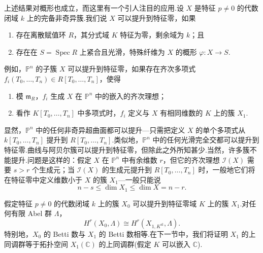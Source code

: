 上述结果对概形也成立，而这里有一个引人注目的应用.设 $X$ 是特征 $p \neq 0$ 的代数闭域 $k$ 上的完备非奇异簇.我们说 $X$ 可以提升到特征零，如果
\begin{enumerate}
  \item 存在离散赋值环 $R$，其分式域 $K$ 特征为零，剩余域为 $k$；且
  \item 存在在 $S = \operatorname{Spec} R$ 上紧合且光滑，特殊纤维为 $X$ 的概形 $\varphi \colon X \to S$.
\end{enumerate}
例如，$\mathbb{P}^{n}$ 的子簇 $X$ 可以提升到特征零，如果存在齐次多项式 $f_i(T_0, \ldots, T_n) \in R[T_0, \ldots, T_n]$，使得
\begin{enumerate}
  \item 模 $\mathfrak{m}_{R}$，$f_i$ 生成 $X$ 在 $\mathbb{P}^{n}$ 中的嵌入的齐次理想；
  \item 看作 $K[T_0, \ldots, T_n]$ 中多项式时，$f_i$ 定义与 $X$ 有相同维数的 $K$ 上的簇 $X_1$.
\end{enumerate}
显然，$\mathbb{P}^{n}$ 中的任何非奇异超曲面都可以提升---只需把定义 $X$ 的单个多项式从 $k[T_0, \ldots, T_n]$ 提升到 $R[T_0, \ldots, T_n]$.类似地，$\mathbb{P}^{n}$ 中的任何光滑完全交都可以提升到特征零.曲线与阿贝尔簇可以提升到特征零，但除此之外所知甚少.当然，许多簇不能提升.问题是这样的：假定 $X$ 在 $\mathbb{P}^{n}$ 中有余维数 $r$，但它的齐次理想 $\mathcal{I}(X)$ 需要 $s > r$ 个生成元；当 $\mathcal{I}(X)$ 的生成元提升到 $R[T_0, \ldots, T_n]$ 时，一般地它们将在特征零中定义维数小于 $X$ 的簇 $X_1$---一般只能说
\[
n - s \leq \dim X_1 \leq \dim X = n - r.
\]

\begin{theorem}\label{thm:20.5}
假定特征 $p \neq 0$ 的代数闭域 $k$ 上的簇 $X_0$ 可以提升到特征零域 $K$ 上的簇 $X_1$.对任何有限 Abel 群 $\Lambda$，
\[
H^{r}(X_0, \Lambda) \cong H^{r}(X_{1, K^{\mathrm{al}}}, \Lambda).
\]
特别地，$X_0$ 的 Betti 数与 $X_1$ 的 Betti 数相等.在下一节中，我们将证明 $X_1$ 的上同调群等于拓扑空间 $X_1(\mathbb{C})$ 的上同调群(假定 $K$ 可以嵌入 $\mathbb{C}$).
\end{theorem}
